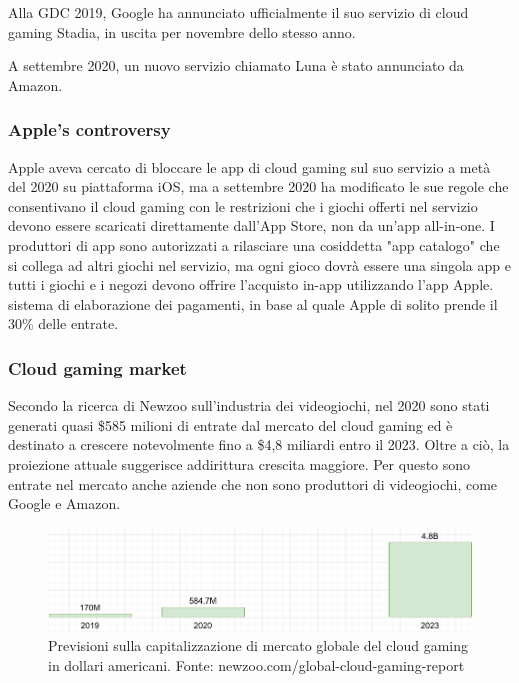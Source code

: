 Alla GDC 2019, Google ha annunciato ufficialmente il suo servizio di cloud gaming Stadia, in uscita per novembre dello stesso anno.

A settembre 2020, un nuovo servizio chiamato Luna è stato annunciato da Amazon\cite{Cloud_gaming_history}.

\subsubsection{Apple's controversy}
Apple aveva cercato di bloccare le app di cloud gaming sul suo servizio a metà del 2020 su piattaforma iOS, ma a settembre 2020 ha modificato le sue regole che consentivano il cloud gaming con le restrizioni che i giochi offerti nel servizio devono essere scaricati direttamente dall'App Store, non da un'app all-in-one. I produttori di app sono autorizzati a rilasciare una cosiddetta "app catalogo" che si collega ad altri giochi nel servizio, ma ogni gioco dovrà essere una singola app e tutti i giochi e i negozi devono offrire l'acquisto in-app utilizzando l'app Apple. sistema di elaborazione dei pagamenti, in base al quale Apple di solito prende il 30\% delle entrate\cite{Apple_controversy}.

\subsubsection{Cloud gaming market}
Secondo la ricerca di Newzoo sull'industria dei videogiochi, nel 2020 sono stati generati quasi \$585 milioni di entrate dal mercato del cloud gaming ed è destinato a crescere notevolmente fino a \$4,8 miliardi entro il 2023. Oltre a ciò, la proiezione attuale suggerisce addirittura crescita maggiore. Per questo sono entrate nel mercato anche aziende che non sono produttori di videogiochi, come Google e Amazon.

\begin{figure}[H]
	\includegraphics[width=\linewidth]{immagini/Newzoo_Cloud_Gaming_Revenues}
	\caption{Previsioni sulla capitalizzazione di mercato globale del cloud gaming in dollari americani. Fonte: newzoo.com/global-cloud-gaming-report}
	\label{fig:Newzoo_Cloud_Gaming_Revenues_Sept_2020}
\end{figure}

